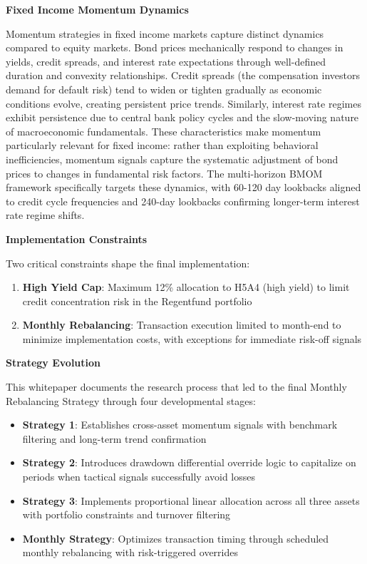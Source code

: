 \documentclass[11pt, letterpaper]{article}
\begin{document}
\textbf{Fixed Income Momentum Dynamics}

Momentum strategies in fixed income markets capture distinct dynamics compared to equity markets. Bond prices mechanically respond to changes in yields, credit spreads, and interest rate expectations through well-defined duration and convexity relationships. Credit spreads (the compensation investors demand for default risk) tend to widen or tighten gradually as economic conditions evolve, creating persistent price trends. Similarly, interest rate regimes exhibit persistence due to central bank policy cycles and the slow-moving nature of macroeconomic fundamentals. These characteristics make momentum particularly relevant for fixed income: rather than exploiting behavioral inefficiencies, momentum signals capture the systematic adjustment of bond prices to changes in fundamental risk factors. The multi-horizon BMOM framework specifically targets these dynamics, with 60-120 day lookbacks aligned to credit cycle frequencies and 240-day lookbacks confirming longer-term interest rate regime shifts.

\textbf{Implementation Constraints}

Two critical constraints shape the final implementation:
\begin{enumerate}
    \item \textbf{High Yield Cap}: Maximum 12\% allocation to H5A4 (high yield) to limit credit concentration risk in the Regentfund portfolio
    \item \textbf{Monthly Rebalancing}: Transaction execution limited to month-end to minimize implementation costs, with exceptions for immediate risk-off signals
\end{enumerate}

\textbf{Strategy Evolution}

This whitepaper documents the research process that led to the final Monthly Rebalancing Strategy through four developmental stages:
\begin{itemize}
    \item \textbf{Strategy 1}: Establishes cross-asset momentum signals with benchmark filtering and long-term trend confirmation
    \item \textbf{Strategy 2}: Introduces drawdown differential override logic to capitalize on periods when tactical signals successfully avoid losses
    \item \textbf{Strategy 3}: Implements proportional linear allocation across all three assets with portfolio constraints and turnover filtering
    \item \textbf{Monthly Strategy}: Optimizes transaction timing through scheduled monthly rebalancing with risk-triggered overrides
\end{itemize}
\end{document}
